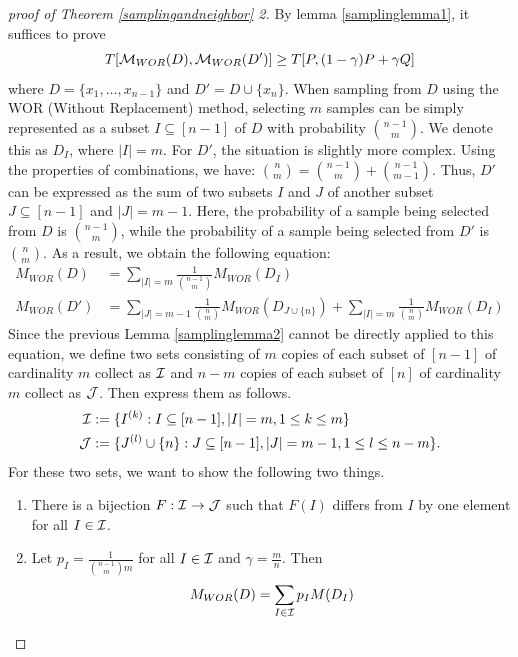 \documentclass{article}
\begin{document}
\begin{proof}[proof of Theorem \ref{samplingandneighbor} 2]
By lemma \ref{samplinglemma1}, it suffices to prove
\begin{equation*}
    T[{\mathcal{M}}_{WOR}(D),{\mathcal{M}}_{WOR}(D')] \ge T[P,(1-\gamma)P +\gamma Q]
\end{equation*}
where $D = \{x_1,\dots,x_{n-1}\}$ and $D' = D \cup \{x_n\}$.
When sampling from $D$ using the WOR (Without Replacement) method, selecting $m$ samples can be simply represented as a subset $I \subseteq [n-1]$ of $D$ with probability $\binom{n-1}{m}$. We denote this as $D_I$, where $|I| = m$. For $D'$, the situation is slightly more complex. Using the properties of combinations, we have: $\binom{n}{m} = \binom{n-1}{m} + \binom{n-1}{m-1}$. Thus, $D'$ can be expressed as the sum of two subsets $I$ and $J$ of another subset $J \subseteq [n-1]$ and $|J| = m-1$. Here, the probability of a sample being selected from $D$ is $\binom{n-1}{m}$, while the probability of a sample being selected from $D'$ is $\binom{n}{m}$. As a result, we obtain the following equation:
\begin{align}
    M_{WOR}(D) &= \sum_{|I|=m} \frac{1}{\binom{n-1}{m}}M_{WOR}(D_I)\\
    M_{WOR}(D') &= \sum_{|J|=m-1} \frac{1}{\binom{n}{m}}M_{WOR}(D_{J\cup \{n\}}) +\sum_{|I|=m} \frac{1}{\binom{n}{m}}M_{WOR}(D_I)\label{equ:the25}
\end{align}
Since the previous Lemma \ref{samplinglemma2} cannot be directly applied to this equation, we define two sets consisting of $m$ copies of each subset of $[n-1]$ of cardinality $m$ collect as ${\mathcal{I}}$ and $n-m$ copies of each subset of $[n]$ of cardinality $m$ collect as ${\mathcal{J}}$. Then express them as follows.
\begin{align*}
    {\mathcal{I}} &:= \{I^{(k)} : I \subseteq [n-1], |I| = m, 1\le k \le m \}\\
    {\mathcal{J}} &:= \{J^{(l)}\cup \{n\}: J \subseteq [n-1], |J| = m-1, 1\le l \le n-m \} .
\end{align*}
For these two sets, we want to show the following two things.
\begin{enumerate}
    \item There is a bijection $F: {\mathcal{I}} \to {\mathcal{J}}$ such that $F(I)$ differs from $I$ by one element for all $I \in {\mathcal{I}}$.
    \item Let $p_I = \frac{1}{\binom{n-1}{m}m}$ for all $I \in {\mathcal{I}}$ and $\gamma = \frac{m}{n}$. Then
    \begin{align*}
        M_{WOR}(D) &= \sum_{I\in \gI}p_I M(D_I)\\

\end{align*}
\end{enumerate}
\end{proof}
\end{document}
